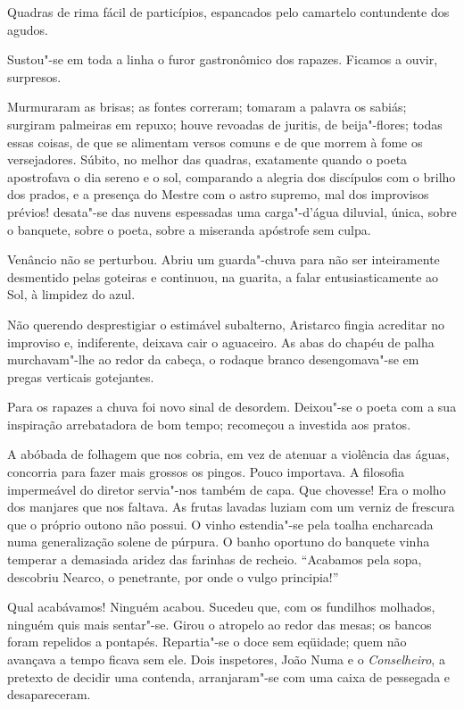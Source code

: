 Quadras de rima fácil de particípios, espancados pelo camartelo
contundente dos agudos. 

Sustou"-se em toda a linha o furor
gastronômico dos rapazes. Ficamos a ouvir, surpresos. 

Murmuraram as brisas; as fontes correram; tomaram a palavra os sabiás; 
surgiram palmeiras em repuxo; houve revoadas de juritis, de beija"-flores;
todas essas coisas, de que se alimentam versos comuns e de que morrem à
fome os versejadores. Súbito, no melhor das quadras, exatamente quando
o poeta apostrofava o dia sereno e o sol, comparando a alegria dos
discípulos com o brilho dos prados, e a presença do Mestre com o astro
supremo, mal dos improvisos prévios! desata"-se das nuvens espessadas
uma carga"-d'água diluvial, única, sobre o banquete, sobre o poeta,
sobre a miseranda apóstrofe sem culpa. 

Venâncio não se perturbou. Abriu
um guarda"-chuva para não ser inteiramente desmentido pelas goteiras e
continuou, na guarita, a falar entusiasticamente ao Sol, à limpidez do
azul. 


Não querendo desprestigiar o estimável subalterno, Aristarco
fingia acreditar no improviso e, indiferente, deixava cair o aguaceiro.
As abas do chapéu de palha murchavam"-lhe ao redor da cabeça, o
rodaque branco desengomava"-se em pregas verticais gotejantes. 

Para os rapazes a chuva foi novo sinal de desordem. Deixou"-se o poeta com a
sua inspiração arrebatadora de bom tempo; recomeçou a investida aos
pratos. 

A abóbada de folhagem que nos cobria, em vez de atenuar a
violência das águas, concorria para fazer mais grossos os pingos. Pouco
importava. A filosofia impermeável do diretor servia"-nos também de
capa. Que chovesse! Era o molho dos manjares que nos faltava. As frutas
lavadas luziam com um verniz de frescura que o próprio outono não
possui. O vinho estendia"-se pela toalha encharcada numa generalização
solene de púrpura. O banho oportuno do banquete vinha temperar a
demasiada aridez das farinhas de recheio. ``Acabamos pela sopa,
descobriu Nearco, o penetrante, por onde o vulgo principia!'' 

Qual acabávamos! Ninguém acabou. Sucedeu que, com os fundilhos molhados,
ninguém quis mais sentar"-se. Girou o atropelo ao redor das mesas; os
bancos foram repelidos a pontapés. Repartia"-se o doce sem eqüidade;
quem não avançava a tempo ficava sem ele. Dois inspetores, João Numa e
o \textit{Conselheiro}, a pretexto de decidir uma contenda, arranjaram"-se com
uma caixa de pessegada e desapareceram. 

